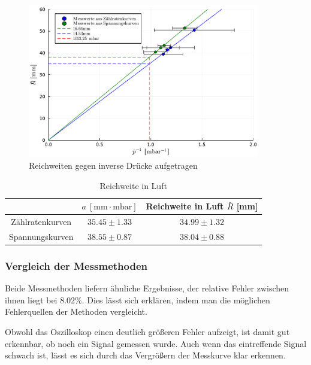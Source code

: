 \documentclass[12pt,a4paper]{scrartcl}
\numberwithin{equation}{section} %
\begin{document}
\begin{figure}[h!]
	\centering
	\includegraphics[width=0.9\textwidth]{../media/B3.3/reichweiten inverse druecke verschoben skaliert.pdf}
	\caption{Reichweiten gegen inverse Drücke aufgetragen}
	\label{fig:reichweiteInverserDruck}
\end{figure}

\begin{table}[H]
	\centering
	\begin{tabular}{||c|c|c||}
		\hline
		& $a\ \left[\mathrm{mm\cdot mbar}\right]$ & Reichweite in Luft $\bar{R}$ [mm]\\
		\hline \hline
		Zählratenkurven
			& $35.45 \pm 1.33$
			& $34.99 \pm 1.32$ \\
		\hline
		Spannungskurven
			& $38.55 \pm 0.87$
			& $38.04 \pm 0.88$ \\
		\hline
	\end{tabular}
	\caption{Reichweite in Luft}
	\label{table_reichweite_druck}
\end{table}

\hypertarget{Reichweite-Vergleich}{%
	\subsubsection{Vergleich der Messmethoden}\label{Reichweite-Vergleich}}

Beide Messmethoden liefern ähnliche Ergebnisse, der relative Fehler zwischen ihnen liegt bei $8.02\%$. Dies lässt sich erklären, indem man die möglichen Fehlerquellen der Methoden vergleicht.

Obwohl das Oszilloskop einen deutlich größeren Fehler aufzeigt, ist damit gut erkennbar, ob noch ein Signal gemessen wurde. Auch wenn das eintreffende Signal schwach ist, lässt es sich durch das Vergrößern der Messkurve klar erkennen.
\end{document}
